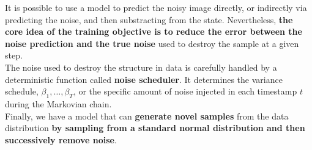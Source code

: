 It is possible to use a model to predict the noisy image directly, or indirectly via predicting the noise, and then substracting from the state. Nevertheless, \textbf{the core idea of the training objective is to reduce the error between the noise prediction and the true noise} used to destroy the sample at a given step. \\

The noise used to destroy the structure in data is carefully handled by a deterministic function called \textbf{noise scheduler}. It determines the variance schedule, $\beta_{1}, \dots, \beta_{T}$, or the specific amount of noise injected in each timestamp $t$ during the Markovian chain. \\

Finally, we have a model that can \textbf{generate novel samples} from the data distribution \textbf{by sampling from a standard normal distribution and then 
successively remove noise}.
